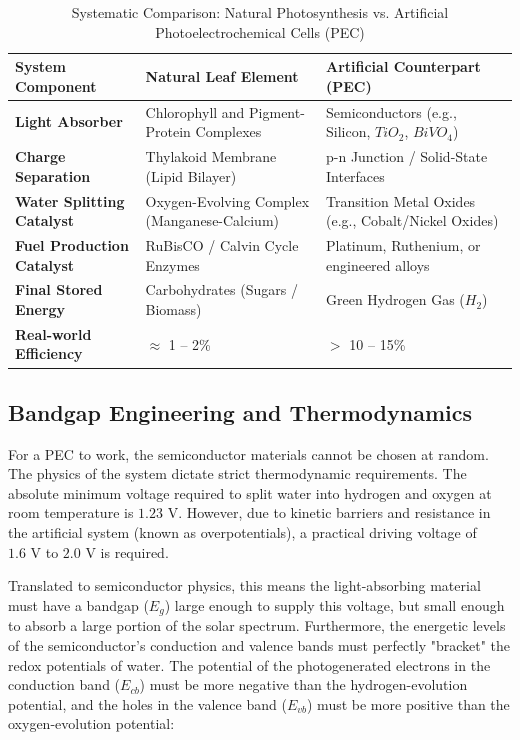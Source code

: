 \documentclass[conference]{IEEEtran}
\begin{document}
\begin{table}[htbp]
\caption{Systematic Comparison: Natural Photosynthesis vs. Artificial Photoelectrochemical Cells (PEC)}
\begin{center}
\renewcommand{\arraystretch}{1.3} 
\begin{tabular}{p{3.5cm} p{6cm} p{6cm}}
\toprule
\textbf{System Component} & \textbf{Natural Leaf Element} & \textbf{Artificial Counterpart (PEC)} \\
\midrule
\textbf{Light Absorber} & Chlorophyll and Pigment-Protein Complexes & Semiconductors (e.g., Silicon, $TiO_2$, $BiVO_4$) \\
\textbf{Charge Separation} & Thylakoid Membrane (Lipid Bilayer) & p-n Junction / Solid-State Interfaces \\
\textbf{Water Splitting Catalyst} & Oxygen-Evolving Complex (Manganese-Calcium) & Transition Metal Oxides (e.g., Cobalt/Nickel Oxides) \\
\textbf{Fuel Production Catalyst} & RuBisCO / Calvin Cycle Enzymes & Platinum, Ruthenium, or engineered alloys \\
\textbf{Final Stored Energy} & Carbohydrates (Sugars / Biomass) & Green Hydrogen Gas ($H_2$) \\
\textbf{Real-world Efficiency} & $\approx$ 1 -- 2\% & $>$ 10 -- 15\% \cite{gratzelPhotoelectrochemicalCells2001} \\
\bottomrule
\end{tabular}
\label{tab:comparison}
\end{center}
\end{table}

\subsection{Bandgap Engineering and Thermodynamics}
For a PEC to work, the semiconductor materials cannot be chosen at random. The physics of the system dictate strict thermodynamic requirements. The absolute minimum voltage required to split water into hydrogen and oxygen at room temperature is $1.23\text{ V}$. However, due to kinetic barriers and resistance in the artificial system (known as overpotentials), a practical driving voltage of $1.6\text{ V}$ to $2.0\text{ V}$ is required.

Translated to semiconductor physics, this means the light-absorbing material must have a bandgap ($E_g$) large enough to supply this voltage, but small enough to absorb a large portion of the solar spectrum. Furthermore, the energetic levels of the semiconductor's conduction and valence bands must perfectly "bracket" the redox potentials of water. The potential of the photogenerated electrons in the conduction band ($E_{cb}$) must be more negative than the hydrogen-evolution potential, and the holes in the valence band ($E_{vb}$) must be more positive than the oxygen-evolution potential:
\end{document}
